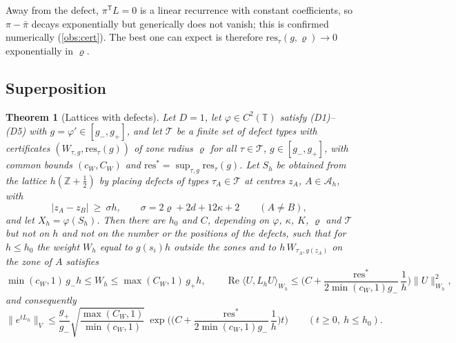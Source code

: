 \documentclass[11pt,a4paper]{article}
\theoremstyle{plain}
\newtheorem{theorem}{Theorem}[section]
\theoremstyle{definition}
\theoremstyle{remark}
\numberwithin{equation}{section}
\newcommand{\Z}{\mathbb{Z}}
\newcommand{\T}{\mathbb{T}}
\renewcommand{\Re}{\operatorname{Re}}
\newcommand{\res}{\mathrm{res}}
\begin{document}
Away from the defect, $\pi^{\mathsf T}L=0$ is a linear recurrence with constant coefficients, so $\pi-\bar\pi$ decays exponentially but generically does not vanish; this is confirmed numerically (\cref{obs:cert}). The best one can expect is therefore $\res_\tau(g,\varrho)\to0$ exponentially in $\varrho$.

\subsection{Superposition}

\begin{theorem}[Lattices with defects]\label{thm:defects}
Let $D=1$, let $\varphi\in C^2(\T)$ satisfy (D1)--(D5) with $g=\varphi'\in[g_-,g_+]$, and let $\mathcal T$ be a finite set of defect types with certificates $(W_{\tau,g},\res_\tau(g))$ of zone radius $\varrho$ for all $\tau\in\mathcal T$, $g\in[g_-,g_+]$, with common bounds $(c_W,C_W)$ and $\res^*=\sup_{\tau,g}\res_\tau(g)$. Let $S_h$ be obtained from the lattice $h(\Z+\frac12)$ by placing defects of types $\tau_A\in\mathcal T$ at centres $z_A$, $A\in\mathcal A_h$, with
\begin{equation}\label{eq:separation}
|z_A-z_B|\ \ge\ \sigma h,\qquad \sigma=2\varrho+2d+12\kappa+2\qquad(A\ne B),
\end{equation}
and let $X_h=\varphi(S_h)$. Then there are $h_0$ and $C$, depending on $\varphi$, $\kappa$, $K$, $\varrho$ and $\mathcal T$ but not on $h$ and not on the number or the positions of the defects, such that for $h\le h_0$ the weight $W_h$ equal to $g(s_i)h$ outside the zones and to $h\,W_{\tau_A,g(z_A)}$ on the zone of $A$ satisfies
\begin{equation}\label{eq:defects}
\min(c_W,1)\,g_-h\le W_h\le\max(C_W,1)\,g_+h,\qquad
\Re\langle U,L_hU\rangle_{W_h}\le\Big(C+\frac{\res^*}{2\min(c_W,1)g_-}\,\frac1h\Big)\|U\|^2_{W_h},
\end{equation}
and consequently
\begin{equation}\label{eq:defectsbound}
\|e^{tL_h}\|_V\le\frac{g_+}{g_-}\sqrt{\frac{\max(C_W,1)}{\min(c_W,1)}}\ \exp\Big(\Big(C+\frac{\res^*}{2\min(c_W,1)g_-}\,\frac1h\Big)t\Big)\qquad(t\ge0,\ h\le h_0).
\end{equation}
\end{theorem}
\end{document}

